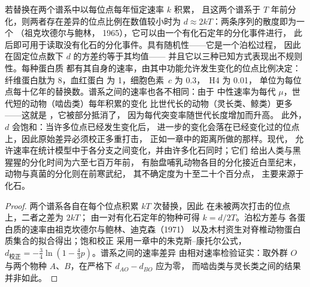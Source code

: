 \begin{proposition}[分子钟及其不规则性]\label{prop:b3:molecular-evolution:clock}
若替换在两个谱系中以每位点每年恒定速率 $k$ 积累，
且这两个谱系于 $T$ 年前分化，则两者存在差异的位点比例在数值较小时为
$d \approx 2kT$：两条序列的散度即为一个
\emph{}（祖克坎德尔与鲍林，
1965），它可以由一个有化石定年的分化事件进行\emph{}，
此后即可用于读取没有化石的分化事件。具有随机性——它是一个泊松过程，
因此在固定位点数下 $d$ 的方差约等于其均值——
并且它以三种已知方式表现出不规则性。每种蛋白质
都有其自身的速率，由其中功能允许发生变化的位点比例决定：
纤维蛋白肽为 \num{8}，血红蛋白
为 \num{1}，细胞色素~$c$ 为 \num{0.3}，~H4 为 \num{0.01}，
单位为每位点每十亿年的替换数。谱系之间的速率也各不相同：由于
中性速率为每代 $\mu$，世代短的动物（啮齿类）每年积累的变化
比世代长的动物（灵长类、鲸类）更多——这就是
\emph{}，它被部分抵消了，
因为每代突变率随世代长度增加而升高。
此外，$d$ 会饱和：当许多位点已经发生变化后，
进一步的变化会落在已经变化过的位点上，因此原始差异必须校正多重打击，
正如一章中的距离所做的那样。现代\emph{}，
允许速率在统计模型中于各分支之间变化，并由许多化石同时；它们
给出人类与黑猩猩的分化时间为六至七百万年前，
有胎盘哺乳动物各目的分化接近白垩纪末，
动物与真菌的分化则在前寒武纪，
其不确定度为十至二十个百分点，
主要来源于化石。
\end{proposition}
\begin{proof}
两个谱系各自在每个位点积累 $kT$ 次替换，因此
在未被两次打击的位点上，二者之差为 $2kT$；
由一对有化石定年的物种可得 $k = d/2T$。泊松方差与
各蛋白质的速率由祖克坎德尔与鲍林、迪克森（1971）
以及木村资生对脊椎动物蛋白质集合的拟合得出；饱和校正
采用一章中的朱克斯–康托尔公式，$d_{\text{校正}} =
-\tfrac{3}{4}\ln(1 - \tfrac{4}{3}p)$。谱系之间的速率差异
由相对速率检验证实：取外群 $O$ 与两个物种
$A$、$B$，在严格下 $d_{AO} - d_{BO}$ 应为零，
而啮齿类与灵长类之间的结果并非如此。
\end{proof}

